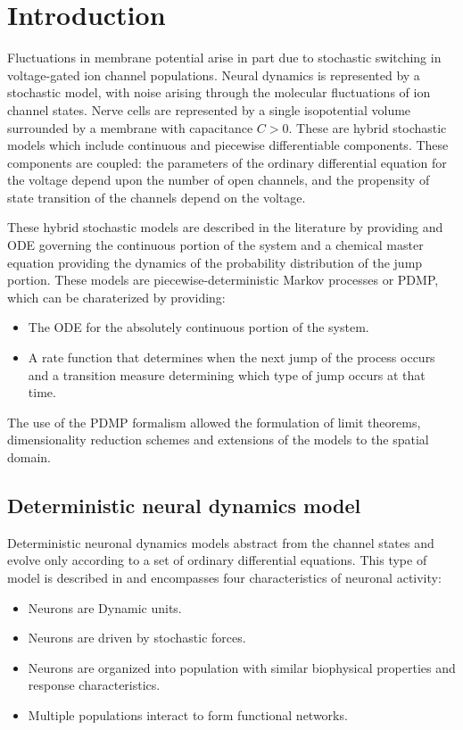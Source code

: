 \section{Introduction}
Fluctuations in membrane potential arise in part due to stochastic switching in voltage-gated ion channel populations.
Neural dynamics is represented by a stochastic model, with noise arising through the molecular fluctuations of ion channel states.
Nerve cells are represented by a single isopotential volume surrounded by a membrane with capacitance $C>0$.
These are hybrid stochastic models which include continuous and piecewise differentiable components.
These components are coupled: the parameters of the ordinary differential equation for the voltage depend upon the number of open channels, and the propensity of state transition of the channels depend on the voltage.

These hybrid stochastic models are described in the literature by providing and ODE governing the continuous portion of the system and a chemical master equation providing the dynamics of the probability distribution of the jump portion.
These models are piecewise-deterministic Markov processes or PDMP, which can be charaterized by providing:

\begin{itemize}
	\item The ODE for the absolutely continuous portion of the system.
	\item A rate function that determines when the next jump of the process occurs and a transition measure determining which type of jump occurs at that time.
\end{itemize}

The use of the PDMP formalism allowed the formulation of limit theorems, dimensionality reduction schemes and extensions of the models to the spatial domain.

	\subsection{Deterministic neural dynamics model}
	Deterministic neuronal dynamics models abstract from the channel states and evolve only according to a set of ordinary differential equations.
	This type of model is described in \cite{stochastic-neuron} and encompasses four characteristics of neuronal activity:

	\begin{itemize}
		\item Neurons are Dynamic units.
		\item Neurons are driven by stochastic forces.
		\item Neurons are organized into population with similar biophysical properties and response characteristics.
		\item Multiple populations interact to form functional networks.
	\end{itemize}

